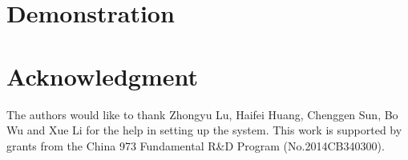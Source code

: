 \documentclass[conference]{IEEEtran}
\begin{document}
\section{Demonstration}




%




\section*{Acknowledgment}


The authors would like to thank Zhongyu Lu, Haifei Huang, Chenggen Sun, Bo Wu and Xue Li for the help in setting up the system.
This work is supported by grants from the China 973 Fundamental R\&D Program (No.2014CB340300).







%
%
%







\end{document}
